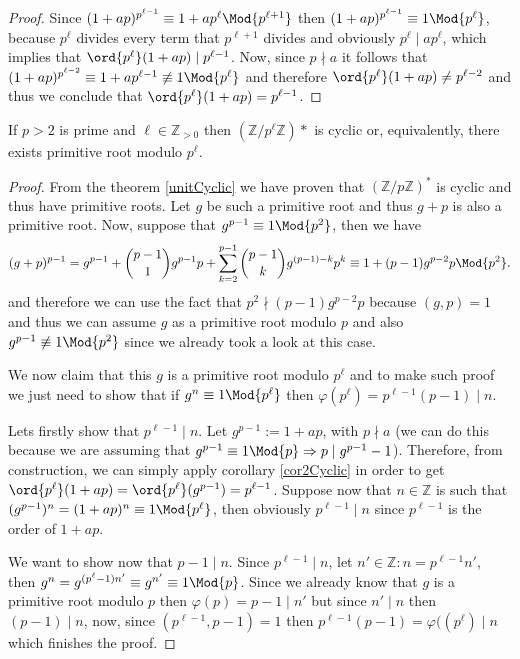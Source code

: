 \begin{proof}
    Since \((1+ap)^{p^{\ell-1}} \equiv 1 + ap^{\ell} \Mod{p^{\ell+1}}\) then \((1
    + ap)^{p^{\ell-1}} \equiv 1 \Mod{p^\ell}\), because \(p^\ell\) divides every
    term that \(p^{\ell+1}\) divides and obviously \(p^{\ell} \mid ap^\ell\),
    which implies that \(\ord{p^\ell}(1 + ap) \mid p^{\ell-1}\). Now, since \(p
    \nmid a\) it follows that \((1+ap)^{p^{\ell-2}} \equiv 1+ap^{\ell-1}
    \not\equiv 1 \Mod{p^\ell}\) and therefore \(\ord{p^\ell}(1 + ap) \neq
    p^{\ell-2}\) and thus we conclude that \(\ord{p^\ell} (1+ap) = p^{\ell-1}\).
\end{proof}

\begin{theorem}
    If \(p > 2\) is prime and  \(\ell \in \mathbb{Z}_{>0}\) then
    \((\mathbb{Z}/p^\ell\mathbb{Z})\ast\) is cyclic or, equivalently, there exists
    primitive root modulo \(p^\ell\).
\end{theorem}

\begin{proof}
    From the theorem \ref{unitCyclic} we have proven that
    \((\mathbb{Z}/p\mathbb{Z})^\ast\) is cyclic and thus have primitive roots.
    Let \(g\) be such a primitive root and thus \(g + p\) is also a primitive
    root.
    Now, suppose that \(g^{p-1} \equiv 1 \Mod{p^2}\), then we have
    \[
        (g + p)^{p-1} = g^{p-1} + \binom{p-1}{1} g^{p-1}p + \sum_{k=2}^{p-1}
        \binom{p-1}{k} g^{(p-1)-k}p^k
        \equiv 1 + (p-1) g^{p-2}p \Mod{p^2}.
    \]
    and therefore we can use the fact that \(p^2 \nmid (p-1) g^{p-2} p\) because
    \((g, p) = 1\) and thus we can assume \(g\) as a primitive root modulo \(p\)
    and also  \(g^{p-1} \not\equiv 1 \Mod{p^2}\) since we already took a look at
    this case.

    We now claim that this \(g\) is a primitive root modulo \(p^\ell\) and to
    make such proof we just need to show that if \(g^n \equiv 1 \Mod{p^\ell}\) then
    \(\varphi(p^\ell) = p^{\ell-1}(p-1) \mid n\).

    Lets firstly show that \(p^{\ell-1} \mid n\). Let \(g^{p-1} := 1 + ap\), with
    \(p \nmid a\) (we can do this because we are assuming that \(g^{p-1} \equiv 1
    \Mod{p} \Rightarrow p \mid g^{p-1} - 1\)). Therefore, from construction, we
    can simply apply corollary \ref{cor2Cyclic} in order to get
    \(\ord{p^\ell}(1+ap) = \ord{p^\ell}(g^{p-1}) = p^{\ell-1}\). Suppose now that
    \(n \in \mathbb{Z}\) is such that \((g^{p-1})^n = (1+ap)^n \equiv 1
    \Mod{p^\ell}\), then obviously \(p^{\ell-1} \mid n\) since \(p^{\ell-1}\) is
    the order of \(1+ap\).

    We want to show now that \(p-1 \mid n\). Since  \(p^{\ell-1} \mid n\), let
    \(n' \in \mathbb{Z} : n = p^{\ell-1} n'\), then \(g^n = g^{(p^\ell-1)n'}
    \equiv g^{n'} \equiv 1 \Mod{p}\). Since we already know that \(g\) is a
    primitive root modulo \(p\) then \(\varphi(p) = p-1 \mid n'\) but since  \(n'
    \mid n\) then \((p-1) \mid n\), now, since \((p^{\ell-1}, p-1) = 1\) then
    \(p^{\ell-1}(p-1) = \varphi((p^\ell) \mid n\) which finishes the proof.
\end{proof}

